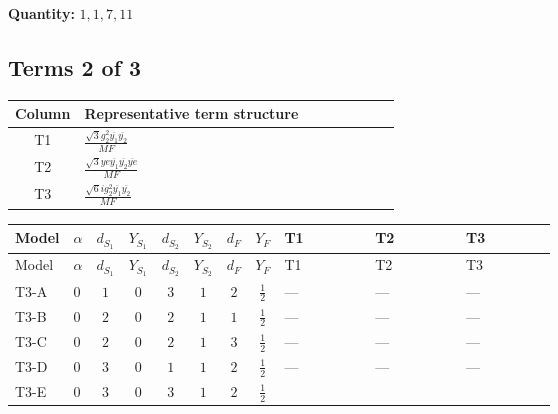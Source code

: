 \documentclass[8pt]{article}
\begin{document}
\begin{landscape}
\begin{longtable}{@{}llcccccc >{\raggedright\arraybackslash}p{0.21\linewidth} >{\raggedright\arraybackslash}p{0.21\linewidth} >{\raggedright\arraybackslash}p{0.21\linewidth}@{}}
\midrule
\bottomrule
\end{longtable}
\clearpage
\noindent\textbf{Quantity: }$\mathrm{1,1,7,11}$\par\smallskip
\subsection*{Terms 2 of 3}
\begin{center}
\begin{tabular}{@{}c >{\raggedright\arraybackslash}p{0.82\linewidth}@{}}
\toprule
Column & Representative term structure \\
\midrule
T1 & \(\displaystyle \frac{\sqrt{3} g_{2}^{2} \overline{y_{1}} \overline{y_{2}}}{MF}\) \\
\midrule
T2 & \(\displaystyle \frac{\sqrt{3} ye \overline{y_{1}} \overline{y_{2}} \overline{ye}}{MF}\) \\
\midrule
T3 & \(\displaystyle \frac{\sqrt{6} i g_{2}^{2} \overline{y_{1}} \overline{y_{2}}}{MF}\) \\
\midrule
\bottomrule
\end{tabular}
\end{center}
\smallskip
\tiny
\begin{longtable}{@{}llcccccc >{\raggedright\arraybackslash}p{0.21\linewidth} >{\raggedright\arraybackslash}p{0.21\linewidth} >{\raggedright\arraybackslash}p{0.21\linewidth}@{}}
\toprule
Model & $\alpha$ & $d_{S_1}$ & $Y_{S_1}$ & $d_{S_2}$ & $Y_{S_2}$ & $d_F$ & $Y_F$ & T1 & T2 & T3 \\
\midrule
\endfirsthead
\toprule
Model & $\alpha$ & $d_{S_1}$ & $Y_{S_1}$ & $d_{S_2}$ & $Y_{S_2}$ & $d_F$ & $Y_F$ & T1 & T2 & T3 \\
\midrule
\endhead
T3-A & $0$ & $1$ & $0$ & $3$ & $1$ & $2$ & $\frac{1}{2}$ & --- & --- & --- \\
\midrule
T3-B & $0$ & $2$ & $0$ & $2$ & $1$ & $1$ & $\frac{1}{2}$ & --- & --- & --- \\
\midrule
T3-C & $0$ & $2$ & $0$ & $2$ & $1$ & $3$ & $\frac{1}{2}$ & --- & --- & --- \\
\midrule
T3-D & $0$ & $3$ & $0$ & $1$ & $1$ & $2$ & $\frac{1}{2}$ & --- & --- & --- \\
\midrule
T3-E & $0$ & $3$ & $0$ & $3$ & $1$ & $2$ & $\frac{1}{2}$ & \scriptsize\adjustbox{max width=\linewidth}{$\begin{gathered} \frac{49 \sqrt{3} g_{2}^{2} \overline{y_{1}} \overline{y_{2}}}{24 MF}\end{gathered}$} & \scriptsize\adjustbox{max width=\linewidth}{$\begin{gathered} - \frac{\sqrt{3} ye \overline{y_{1}} \overline{y_{2}} \overline{ye}}{12 MF}\end{gathered}$} & \scriptsize\adjustbox{max width=\linewidth}{$\begin{gathered} \frac{\sqrt{6} i g_{2}^{2} \overline{y_{1}} \overline{y_{2}}}{3 MF}\end{gathered}$} \\

\end{longtable}
\end{landscape}
\end{document}
